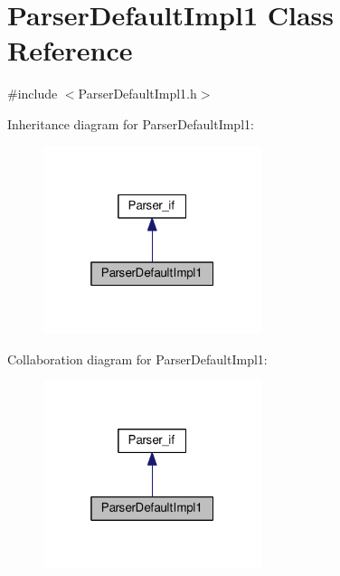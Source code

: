 \hypertarget{class_parser_default_impl1}{}\section{Parser\+Default\+Impl1 Class Reference}
\label{class_parser_default_impl1}


{\ttfamily \#include $<$Parser\+Default\+Impl1.\+h$>$}



Inheritance diagram for Parser\+Default\+Impl1\+:\nopagebreak
\begin{figure}[H]
\begin{center}
\leavevmode
\includegraphics[width=181pt]{class_parser_default_impl1__inherit__graph}
\end{center}
\end{figure}


Collaboration diagram for Parser\+Default\+Impl1\+:\nopagebreak
\begin{figure}[H]
\begin{center}
\leavevmode
\includegraphics[width=181pt]{class_parser_default_impl1__coll__graph}
\end{center}
\end{figure}
